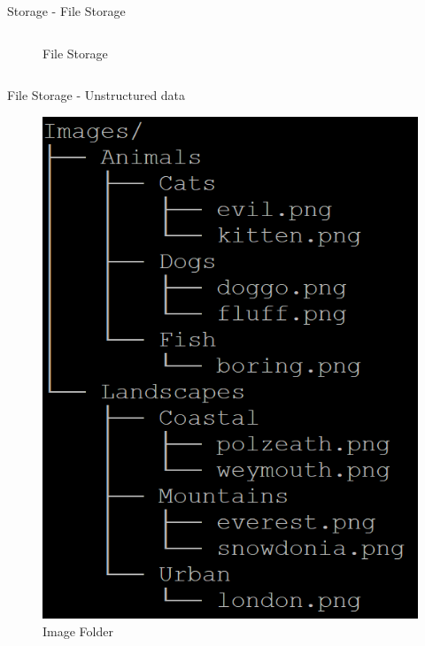 \begin{frame}{Storage - File Storage}
\begin{columns}
\begin{column}{0.47\textwidth}
\begin{figure}
        \caption{File Storage}
        \label{fig:my_label}
    \end{figure}
    \end{column}
\end{columns}
\end{frame}
\begin{frame}{File Storage - Unstructured data}
    \begin{figure}
        \centering
        \includegraphics[width=\textwidth,height=0.7\textheight,keepaspectratio]{img/image-tree.png}
        \caption{Image Folder}
        \label{fig:my_label}
    \end{figure}  
\end{frame}


